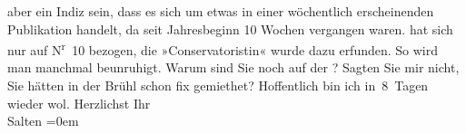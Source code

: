 \begin{ledgroupsized}[t]{13cm}
{{{               aber ein Indiz sein, dass es sich um etwas in einer wöchentlich erscheinenden Publikation handelt, da seit 
               Jahresbeginn 10 Wochen vergangen waren.}}}\label{K_L03324-2h} hat sich nur auf
                  N\textsuperscript{r} 10 bezogen, die »Conservatoristin« wurde dazu
               erfunden. So wird man manchmal beunruhigt. Warum sind Sie noch auf der \label{K_L03324-3v}\label{K_L03324-3h}? Sagten Sie mir nicht, Sie hätten in der Brühl schon fix gemiethet?\pend
           \pstart
           Hoffentlich bin ich in 8 Tagen wieder wol.\pend
           \pstart
           Herzlichst Ihr{\\[\baselineskip]}\spacefill\mbox{Salten}\pend
           \leftskip=0em{}
         
         \endnumbering{}\end{ledgroupsized}  \newcommand{\dateiname}{L03324}\newcommand{\titel}{Felix Salten an Arthur Schnitzler, [10?. 3. 1902]}\newcommand{\editorInnen}{Martin Anton Müller und Laura Untner}
      